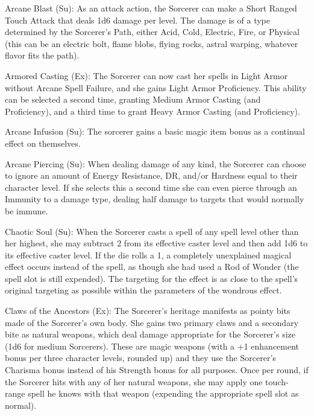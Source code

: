 \begin{description*}

\item[Arcane Blast (Su):] As an attack action, the Sorcerer can make a Short Ranged Touch Attack that deals 1d6 damage per level. The damage is of a type determined by the Sorcerer's Path, either Acid, Cold, Electric, Fire, or Physical (this can be an electric bolt, flame blobs, flying rocks, astral warping, whatever flavor fits the path).

\item[Armored Casting (Ex):] The Sorcerer can now cast her spells in Light Armor without Arcane Spell Failure, and she gains Light Armor Proficiency. This ability can be selected a second time, granting Medium Armor Casting (and Proficiency), and a third time to grant Heavy Armor Casting (and Proficiency).

\item[Arcane Infusion (Su):] The sorcerer gains a basic magic item bonus as a continual effect on themselves.

\item[Arcane Piercing (Su):] When dealing damage of any kind, the Sorcerer can choose to ignore an amount of Energy Resistance, DR, and/or Hardness equal to their character level. If she selects this a second time she can even pierce through an Immunity to a damage type, dealing half damage to targets that would normally be immune.

\item[Chaotic Soul (Su):] When the Sorcerer casts a spell of any spell level other than her highest, she may subtract 2 from its effective caster level and then add 1d6 to its effective caster level. If the die rolls a 1, a completely unexplained magical effect occurs instead of the spell, as though she had used a Rod of Wonder (the spell slot is still expended). The targeting for the effect is as close to the spell's original targeting as possible within the parameters of the wondrous effect.

\item[Claws of the Ancestors (Ex):] The Sorcerer's heritage manifests as pointy bits made of the Sorcerer's own body. She gains two primary claws and a secondary bite as natural weapons, which deal damage appropriate for the Sorcerer's size (1d6 for medium Sorcerers). These are magic weapons (with a +1 enhancement bonus per three character levels, rounded up) and they use the Sorcerer's Charisma bonus instead of his Strength bonus for all purposes. Once per round, if the Sorcerer hits with any of her natural weapons, she may apply one touch-range spell he knows with that weapon (expending the appropriate spell slot as normal).


\end{description*}
